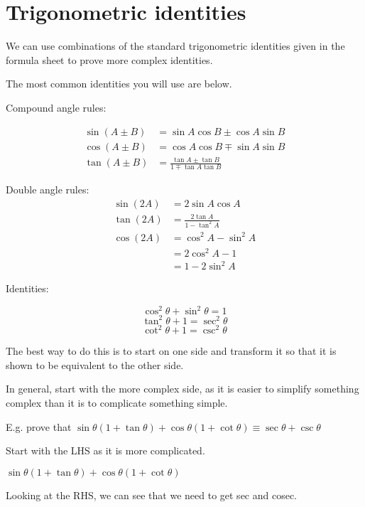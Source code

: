 \documentclass[../main.tex]{subfiles}
\begin{document}
\section{Trigonometric identities}
We can use combinations of the standard trigonometric identities given in the formula sheet to prove more complex identities.

The most common identities you will use are below.

Compound angle rules:

\begin{equation*}
    \begin{aligned}
\sin{(A\pm B)}&=\sin{A}\cos{B}\pm \cos{A}\sin{B}\\
\cos{(A\pm B)}&=\cos{A}\cos{B}\mp \sin{A}\sin{B}\\
\tan{(A\pm B)}&=\frac{\tan{A}\pm \tan{B}}{1 \mp \tan{A}\tan{B}}
\end{aligned}
\end{equation*}

Double angle rules:
\begin{equation*}
    \begin{aligned}
\sin{(2A)}&=2\sin{A}\cos{A}\\
\tan{(2A)}&=\frac{2\tan{A}}{1-\tan^2{A}}\\
    \cos{(2A)}&=\cos^2{A}-\sin^2{A}\\
    &=2\cos^2{A}-1\\
    &=1-2\sin^2{A}
\end{aligned}
\end{equation*}

Identities:

\[\cos^2{\theta}+\sin^2{\theta}=1\]
\[\tan^2{\theta}+1=\sec^2{\theta}\]
\[\cot^2{\theta}+1=\csc^2{\theta}\]


The best way to do this is to start on one side and transform it so that it is shown to be equivalent to the other side.
 
In general, start with the more complex side, as it is easier to simplify something complex than it is to complicate something simple.

E.g. prove that $\sin{\theta}(1+\tan{\theta})+\cos{\theta}(1+\cot{\theta}) \equiv \sec{\theta}+\csc{\theta}$

Start with the LHS as it is more complicated.

$\sin{\theta}(1+\tan{\theta})+\cos{\theta}(1+\cot{\theta})$

Looking at the RHS, we can see that we need to get sec and cosec.
\end{document}
